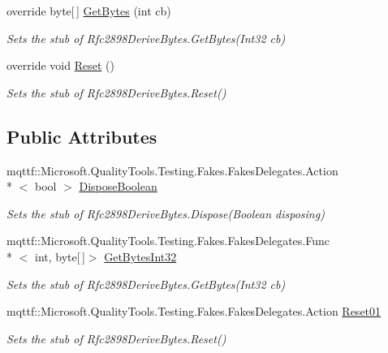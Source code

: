 \begin{DoxyCompactItemize}
override byte\mbox{[}$\,$\mbox{]} \hyperlink{class_system_1_1_security_1_1_cryptography_1_1_fakes_1_1_stub_rfc2898_derive_bytes_a8d3337256c387894b72bf83723f18438}{Get\-Bytes} (int cb)
\begin{DoxyCompactList}\small\item\em Sets the stub of Rfc2898\-Derive\-Bytes.\-Get\-Bytes(\-Int32 cb)\end{DoxyCompactList}\item 
override void \hyperlink{class_system_1_1_security_1_1_cryptography_1_1_fakes_1_1_stub_rfc2898_derive_bytes_a8c2ecc34347cd231b610bf75499c49f9}{Reset} ()
\begin{DoxyCompactList}\small\item\em Sets the stub of Rfc2898\-Derive\-Bytes.\-Reset()\end{DoxyCompactList}\end{DoxyCompactItemize}
\subsection*{Public Attributes}
\begin{DoxyCompactItemize}
\item 
mqttf\-::\-Microsoft.\-Quality\-Tools.\-Testing.\-Fakes.\-Fakes\-Delegates.\-Action\\*
$<$ bool $>$ \hyperlink{class_system_1_1_security_1_1_cryptography_1_1_fakes_1_1_stub_rfc2898_derive_bytes_ade568c36f867aa9b5ed80ebc56e74f66}{Dispose\-Boolean}
\begin{DoxyCompactList}\small\item\em Sets the stub of Rfc2898\-Derive\-Bytes.\-Dispose(\-Boolean disposing)\end{DoxyCompactList}\item 
mqttf\-::\-Microsoft.\-Quality\-Tools.\-Testing.\-Fakes.\-Fakes\-Delegates.\-Func\\*
$<$ int, byte\mbox{[}$\,$\mbox{]}$>$ \hyperlink{class_system_1_1_security_1_1_cryptography_1_1_fakes_1_1_stub_rfc2898_derive_bytes_a3447bdc6dec428b41259af1260268770}{Get\-Bytes\-Int32}
\begin{DoxyCompactList}\small\item\em Sets the stub of Rfc2898\-Derive\-Bytes.\-Get\-Bytes(\-Int32 cb)\end{DoxyCompactList}\item 
mqttf\-::\-Microsoft.\-Quality\-Tools.\-Testing.\-Fakes.\-Fakes\-Delegates.\-Action \hyperlink{class_system_1_1_security_1_1_cryptography_1_1_fakes_1_1_stub_rfc2898_derive_bytes_a4a437a606658b1a7fded2d6a4631b545}{Reset01}
\begin{DoxyCompactList}\small\item\em Sets the stub of Rfc2898\-Derive\-Bytes.\-Reset()\end{DoxyCompactList}\end{DoxyCompactItemize}
